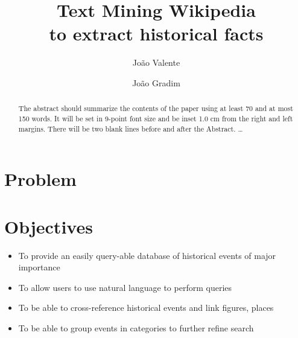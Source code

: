 \documentclass{llncs}
\begin{document}
\mainmatter              %
%
\title{Text Mining Wikipedia\\to extract historical facts}
%
%
\author{João Valente \and João Gradim}
%
%
%

\maketitle              %

\begin{abstract}
The abstract should summarize the contents of the paper
using at least 70 and at most 150 words. It will be set in 9-point
font size and be inset 1.0 cm from the right and left margins.
There will be two blank lines before and after the Abstract. \dots
\end{abstract}

\section{Problem}

\section{Objectives}

\begin{itemize}
	\item To provide an easily query-able database of historical events of major importance
	\item To allow users to use natural language to perform queries
	\item To be able to cross-reference historical events and link figures, places
	\item To be able to group events in categories to further refine search
\end{itemize}
\end{document}
